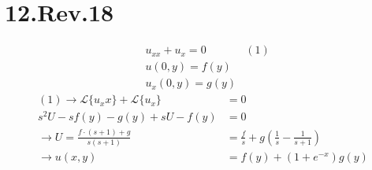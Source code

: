 \documentclass[11pt,a4paper]{article}
\newcommand{\Laplace}{\mathcal{L}}
\begin{document}
\newpage

\section*{12.Rev.18}
\begin{align*}
    & u_{xx} + u_x = 0 & (1)\\
    & u(0, y) = f(y) \\
    & u_x(0, y) = g(y)
\end{align*}
\begin{align*}
    (1) \rightarrow \Laplace\{u_xx\} + \Laplace\{u_x\} &= 0 \\
    s^2U - sf(y) - g(y) + sU - f(y) &= 0 \\
    \rightarrow U = \frac{f \cdot (s+1) + g}{s(s+1)} 
    &= \frac{f}{s} + g\left(\frac{1}{s} - \frac{1}{s+1}\right) \\
    \rightarrow u(x, y) &= f(y) + (1+e^{-x})g(y)
\end{align*}
\end{document}
